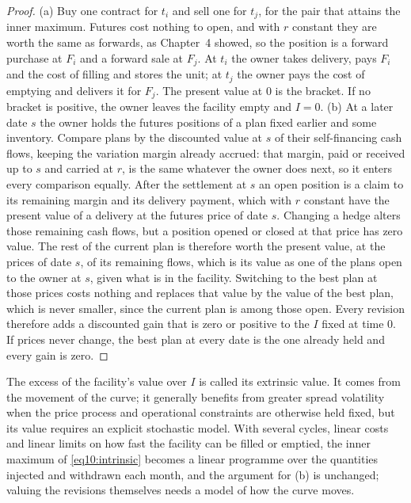 \begin{chapterrefs}
\begin{proof}
(a) Buy one contract for $t_i$ and sell one for $t_j$, for the pair that attains the inner maximum.
Futures cost nothing to open, and with $r$ constant they are worth the same as forwards, as Chapter~4
showed, so the position is a forward purchase at $F_i$ and a forward sale at $F_j$. At $t_i$ the owner
takes delivery, pays $F_i$ and the cost of filling and stores the unit; at $t_j$ the owner pays the cost of
emptying and delivers it for $F_j$. The present value at $0$ is the bracket. If no bracket is positive,
the owner leaves the facility empty and $I=0$.
(b) At a later date $s$ the owner holds the futures positions of a plan fixed earlier and some
inventory. Compare plans by the discounted value at $s$ of their self-financing cash flows, keeping the
variation margin already accrued: that margin, paid or received up to $s$ and carried at $r$, is the same
whatever the owner does next, so it enters every comparison equally. After the settlement at $s$ an open
position is a claim to its remaining margin and its delivery payment, which with $r$ constant have the
present value of a delivery at the futures price of date $s$. Changing a hedge alters those remaining
cash flows, but a position opened or closed at that price has zero value. The rest of the current plan is
therefore worth the present value, at the prices of date $s$, of its remaining flows, which is its value
as one of the plans open to the owner at $s$, given what is in the facility. Switching to the best plan at
those prices costs nothing and replaces that value by the value of the best plan, which is never smaller,
since the current plan is among those open. Every revision therefore adds a discounted gain that is zero or positive to the $I$ fixed at
time $0$. If prices never change, the best plan at every date is the one already held and every gain is
zero.
\end{proof}

The excess of the facility's value over $I$ is called its extrinsic value. It comes from the movement of
the curve; it generally benefits from greater spread volatility when the price process and operational
constraints are otherwise held fixed, but its value requires an explicit stochastic model. With several cycles,
linear costs and linear limits on how fast the facility can be filled or emptied, the inner maximum of
\cref{eq10:intrinsic} becomes a linear programme over the quantities injected and withdrawn each month, and
the argument for (b) is unchanged; valuing the revisions themselves needs a model of how the curve moves.


\end{chapterrefs}

